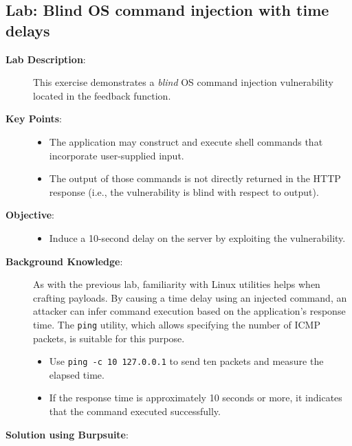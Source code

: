 \documentclass{article}
\begin{document}
\subsection*{Lab: Blind OS command injection with time delays}
\begin{description}
  \item[\textbf{Lab Description}:] This exercise demonstrates a \emph{blind} OS command injection vulnerability located in the feedback function.

  \item[\textbf{Key Points}:]\leavevmode\par
    \begin{itemize}
      \item The application may construct and execute shell commands that incorporate user-supplied input.
      \item The output of those commands is not directly returned in the HTTP response (i.e., the vulnerability is blind with respect to output).
    \end{itemize}

  \item[\textbf{Objective}:]\leavevmode\par
    \begin{itemize}
      \item Induce a 10-second delay on the server by exploiting the vulnerability.
    \end{itemize}

  \item[\textbf{Background Knowledge}:]\leavevmode\par
    As with the previous lab, familiarity with Linux utilities helps when crafting payloads. By causing a time delay using an injected command, an attacker can infer command execution based on the application's response time. The \texttt{ping} utility, which allows specifying the number of ICMP packets, is suitable for this purpose.
    \begin{itemize}
      \item Use \texttt{ping -c 10 127.0.0.1} to send ten packets and measure the elapsed time.
      \item If the response time is approximately 10 seconds or more, it indicates that the command executed successfully.
    \end{itemize}

    \item[\textbf{Solution using Burpsuite}:] \leavevmode\par


\end{description}
\end{document}
